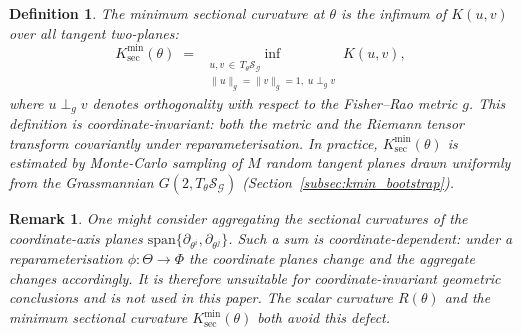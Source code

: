 \documentclass[a4paper,fleqn]{cas-dc}
\newtheorem{definition}{Definition}
\newtheorem{remark}{Remark}
\newcommand{\calS}{\mathcal{S}}
\newcommand{\calG}{\mathcal{G}}
\begin{document}
\begin{definition}%
  \label{def:min_sectional}
  The \emph{minimum sectional curvature} at $\theta$ is the infimum of
  $K(u,v)$ over all tangent two-planes:
  \begin{equation}
    K_{\sec}^{\min}(\theta)
    \;=\; \inf_{\substack{u,v\,\in\, T_\theta\calS_{\calG} \\
                          \|u\|_g=\|v\|_g=1,\;u\perp_g v}}
          K(u,v),
    \label{eq:min_sectional}
  \end{equation}
  where $u\perp_g v$ denotes orthogonality with respect to the Fisher--Rao
  metric $g$.
  This definition is coordinate-invariant: both the metric and the
  Riemann tensor transform covariantly under reparameterisation.
  In practice, $K_{\sec}^{\min}(\theta)$ is estimated by Monte-Carlo
  sampling of $M$ random tangent planes drawn uniformly from the
  Grassmannian $G(2, T_\theta\calS_{\calG})$
  (Section~\ref{subsec:kmin_bootstrap}).
\end{definition}

\begin{remark}%
  \label{rem:no_coord_V}
  One might consider aggregating the sectional curvatures of the
  coordinate-axis planes $\mathrm{span}\{\partial_{\theta^i}, \partial_{\theta^j}\}$.
  Such a sum is \emph{coordinate-dependent}: under a reparameterisation
  $\phi:\Theta\to\Phi$ the coordinate planes change and the aggregate
  changes accordingly.
  It is therefore unsuitable for coordinate-invariant geometric conclusions
  and is not used in this paper.
  The scalar curvature $R(\theta)$ and the minimum sectional curvature
  $K_{\sec}^{\min}(\theta)$ both avoid this defect.
\end{remark}
\end{document}
